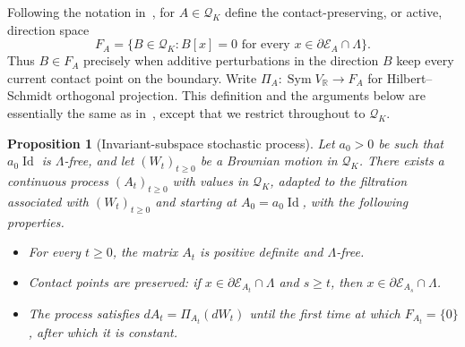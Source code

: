 \documentclass[11pt]{article}
\newtheorem{proposition}[theorem]{Proposition}
\theoremstyle{remark}
\newcommand{\R}{\mathbb R}
\newcommand{\Sym}{\operatorname{Sym}}
\newcommand{\Id}{\operatorname{Id}}
\newcommand{\calE}{\mathcal E}
\begin{document}
Following the notation in~\cite[equation~(13)]{Klartag}, for
$A\in\mathcal Q_K$ define the contact-preserving, or active, direction
space
\begin{equation}
        F_A=\{B\in\mathcal Q_K:B[x]=0
        \text{ for every }x\in\partial\calE_A\cap\Lambda\}.
\label{eq:FA}
\end{equation}
Thus $B\in F_A$ precisely when additive perturbations in the direction $B$
keep every current contact point on the boundary.
Write $\Pi_A:\Sym V_\R\to F_A$ for Hilbert--Schmidt orthogonal projection.
This definition and the arguments below are essentially the same as
in~\cite{Klartag}, except that we restrict throughout to $\mathcal Q_K$.

\begin{proposition}[Invariant-subspace stochastic process]\label{prop:process}
Let $a_0>0$ be such that $a_0\Id$ is $\Lambda$-free, and let $(W_t)_{t\ge0}$
be a Brownian motion in $\mathcal Q_K$.  There exists a continuous
process $(A_t)_{t\ge0}$ with values in $\mathcal Q_K$, adapted to the
filtration associated with $(W_t)_{t\ge0}$ and starting at $A_0=a_0\Id$, with
the following properties.
\begin{itemize}
\item[(i)] For every $t\ge0$, the matrix $A_t$ is positive definite and $\Lambda$-free.
\item[(ii)] Contact points are preserved: if $x\in\partial\calE_{A_t}\cap\Lambda$ and $s\ge t$, then $x\in\partial\calE_{A_s}\cap\Lambda$.
\item[(iii)] The process satisfies $dA_t=\Pi_{A_t}(dW_t)$ until the first time
at which $F_{A_t}=\{0\}$, after which it is constant.
\end{itemize}
\end{proposition}
\end{document}

